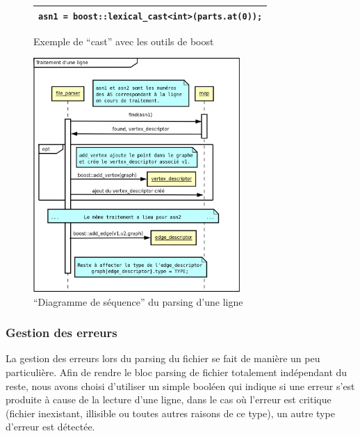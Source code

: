 \begin{figure}[H]
   \begin{center}
      \begin{tabular}{l}
        \hline 
 	\verb|asn1 = boost::lexical_cast<int>(parts.at(0));|\\
        \hline
      \end{tabular}
   \end{center}
\caption{\label{cast_boost} Exemple de ``cast'' avec les outils de boost}
\end{figure}

\begin{figure}[H]
\begin{center}
        \includegraphics[width=0.7\textwidth]{./schema/file_parser2.png}
\caption{``Diagramme de séquence'' du parsing d'une ligne }
\label{file_parser}
\end{center}
\end{figure}

\subsubsection{Gestion des erreurs}

La gestion des erreurs lors du parsing du fichier se fait de manière un peu particulière. Afin de rendre le bloc parsing de fichier totalement indépendant du reste, nous avons choisi d'utiliser un simple booléen qui indique si une erreur s'est produite à cause de la lecture d'une ligne, dans le cas où l'erreur est critique (fichier inexistant, illisible ou toutes autres raisons de ce type), un autre type d'erreur est détectée. 

